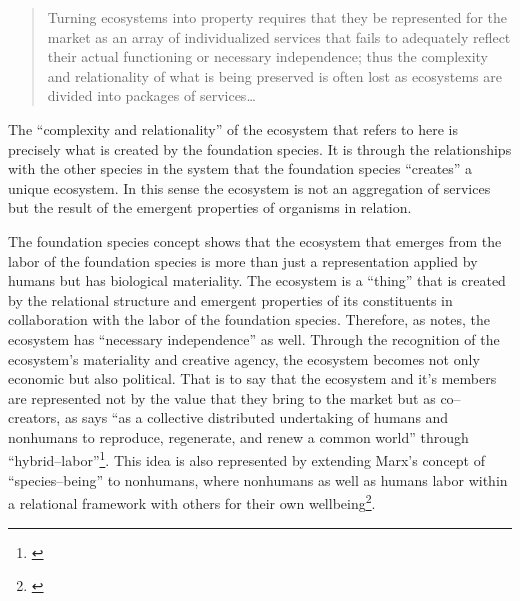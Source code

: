 \documentclass{article}
\begin{document}
{\begin{quote}
Turning ecosystems into property requires that they be represented for the market as an array of individualized services that fails to adequately reflect their actual functioning or necessary independence; thus the complexity and relationality of what is being preserved is often lost as ecosystems are divided into packages of services\ldots
\end{quote}

The ``complexity and relationality'' of the ecosystem that \citeauthor{battistoni_bringing_2017} refers to here is precisely what is created by the foundation species. It is through the relationships with the other species in the system that the foundation species ``creates'' a unique ecosystem. In this sense the ecosystem is not an aggregation of services but the result of the emergent properties of organisms in relation.

The foundation species concept shows that the ecosystem that emerges from the labor of the foundation species is more than just a representation applied by humans but has biological materiality. The ecosystem is a ``thing'' that is created by the relational structure and emergent properties of its constituents in collaboration with the labor of the foundation species. Therefore, as \citeauthor{battistoni_bringing_2017} notes, the ecosystem has ``necessary independence'' as well. Through the recognition of the ecosystem's materiality and creative agency, the ecosystem becomes not only economic but also political. That is to say that the ecosystem and it's members are represented not by the value that they bring to the market but as co--creators, as \citeauthor{battistoni_bringing_2017} says ``as a collective distributed undertaking of humans and nonhumans to reproduce, regenerate, and renew a common world'' through ``hybrid--labor''\footnote{\cite[p. 6]{battistoni_bringing_2017}}. This idea is also represented by extending Marx's concept of ``species--being'' to nonhumans, where nonhumans as well as humans labor within a relational framework with others for their own wellbeing\footnote{\cite{fair_toward_2023}}. 

}
\end{document}
